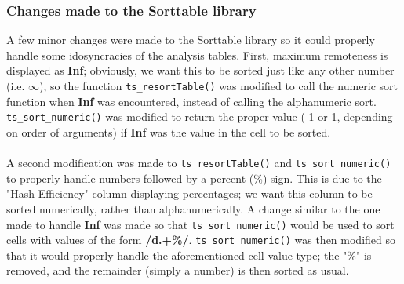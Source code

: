 \documentclass[11pt]{article}
\begin{document}
\subsubsection{Changes made to the Sorttable library}
A few minor changes were made to the Sorttable library so it could properly handle some idosyncracies of the analysis tables. First, maximum remoteness is displayed as \textbf{Inf}; obviously, we want this to be sorted just like any other number (i.e. $\infty$), so the function \texttt{ts\_resortTable()} was modified to call the numeric sort function when \textbf{Inf} was encountered, instead of calling the alphanumeric sort. \texttt{ts\_sort\_numeric()} was modified to return the proper value (-1 or 1, depending on order of arguments) if \textbf{Inf} was the value in the cell to be sorted.\\\\
A second modification was made to \texttt{ts\_resortTable()} and \texttt{ts\_sort\_numeric()} to properly handle numbers followed by a percent (\%) sign. This is due to the "Hash Efficiency" column displaying percentages; we want this column to be sorted numerically, rather than alphanumerically. A change similar to the one made to handle \textbf{Inf} was made so that \texttt{ts\_sort\_numeric()} would be used to sort cells with values of the form \textbf{/d.+\%/}. \texttt{ts\_sort\_numeric()} was then modified so that it would properly handle the aforementioned cell value type; the "\%" is removed, and the remainder (simply a number) is then sorted as usual.
\end{document}
